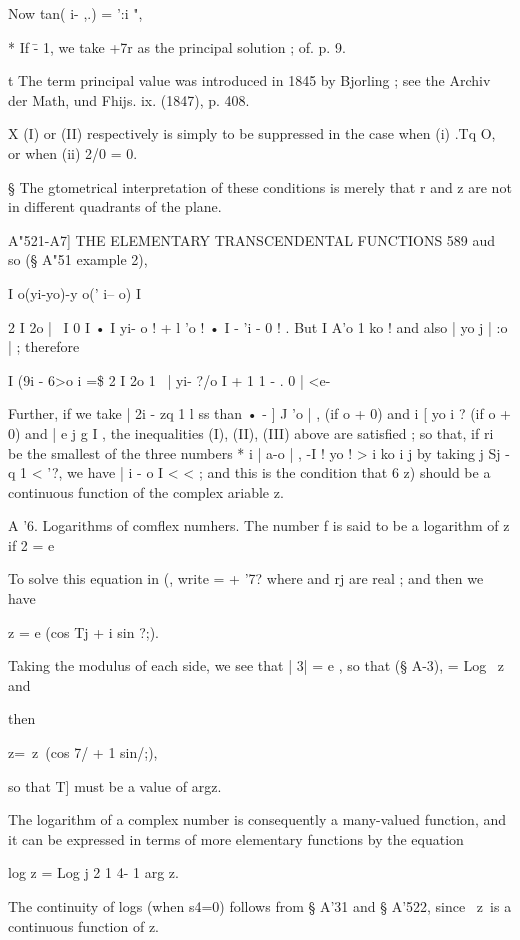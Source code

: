 Now tan( i- ,.) =  ':i ", 

* If \= - 1, we take +7r as the principal solution ; of. p. 9. 

t The term principal value was introduced in 1845 by Bjorling ; see the Archiv der Math, 
und Fhijs. ix. (1847), p. 408. 

X (I) or (II) respectively is simply to be suppressed in the case when (i) .Tq O, or when 
(ii) 2/0 = 0. 

§ The gtometrical interpretation of these conditions is merely that r  and z  are not in 
different quadrants of the plane. 



A"521-A7] THE ELEMENTARY TRANSCENDENTAL FUNCTIONS 589 
aud so (§ A"51 example 2), 

  I   o(yi-yo)-y o(' i-- o) I 

  2 I 2o |~   I  0 I • I yi- o ! + l 'o ! • I - 'i - 0 ! . 
But I A'o 1   ko ! and also | yo j   |  :o | ; therefore 

I (9i - 6>o i =\$ 2 I 2o 1~   | yi- ?/o I + 1  1 - . 0 | <e- 

Further, if we take | 2i - zq 1 l ss than • - ] J 'o | , (if  o + 0) and i [ yo i ? (if  o + 0) and | e j  g I , 
the inequalities (I), (II), (III) above are satisfied ; so that, if ri be the smallest of the 
three numbers * i | a-o | , -I ! yo ! > i  ko i j by taking j Sj -  q 1 < '?, we have |  i -  o I < < ; and this 
is the condition that 6  z) should be a continuous function of the complex   ariable z. 

A '6. Logarithms of comflex numhers. 
The number f is said to be a logarithm of z if 2 = e  

To solve this equation in (, write  =  +  '7? where   and rj are real ; and then we have 

z = e  (cos Tj + i sin ?;). 

Taking the modulus of each side, we see that | 3| = e , so that (§ A-3),   = Log \ z\; and 

then 

z=\ z\ (cos 7/ + 1 sin/;), 

so that T] must be a value of argz. 

The logarithm of a complex number is consequently a many-valued function, and it 
can be expressed in terms of more elementary functions by the equation 

log z = Log j 2 1 4- 1 arg z. 

The continuity of logs (when s4=0) follows from § A'31 and § A'522, since \ z\ is a 
continuous function of z. 

